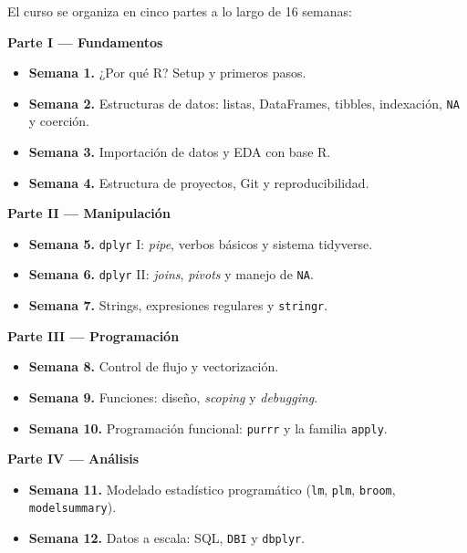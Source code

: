 \documentclass[11pt,letterpaper]{article}
\begin{document}
El curso se organiza en cinco partes a lo largo de 16 semanas:

\smallskip
\noindent\textbf{\textcolor{main}{Parte I --- Fundamentos}}
\begin{itemize}[leftmargin=*, itemsep=1pt]
    \item \textbf{Semana 1.} ¿Por qué R? Setup y primeros pasos.
    \item \textbf{Semana 2.} Estructuras de datos: listas, DataFrames, tibbles, indexación, \texttt{NA} y coerción.
    \item \textbf{Semana 3.} Importación de datos y EDA con base R.
    \item \textbf{Semana 4.} Estructura de proyectos, Git y reproducibilidad.
\end{itemize}

\smallskip
\noindent\textbf{\textcolor{main}{Parte II --- Manipulación}}
\begin{itemize}[leftmargin=*, itemsep=1pt]
    \item \textbf{Semana 5.} \texttt{dplyr} I: \textit{pipe}, verbos básicos y sistema tidyverse.
    \item \textbf{Semana 6.} \texttt{dplyr} II: \textit{joins}, \textit{pivots} y manejo de \texttt{NA}.
    \item \textbf{Semana 7.} Strings, expresiones regulares y \texttt{stringr}.
\end{itemize}

\smallskip
\noindent\textbf{\textcolor{main}{Parte III --- Programación}}
\begin{itemize}[leftmargin=*, itemsep=1pt]
    \item \textbf{Semana 8.} Control de flujo y vectorización.
    \item \textbf{Semana 9.} Funciones: diseño, \textit{scoping} y \textit{debugging}.
    \item \textbf{Semana 10.} Programación funcional: \texttt{purrr} y la familia \texttt{apply}.
\end{itemize}

\smallskip
\noindent\textbf{\textcolor{main}{Parte IV --- Análisis}}
\begin{itemize}[leftmargin=*, itemsep=1pt]
    \item \textbf{Semana 11.} Modelado estadístico programático (\texttt{lm}, \texttt{plm}, \texttt{broom}, \texttt{modelsummary}).
    \item \textbf{Semana 12.} Datos a escala: SQL, \texttt{DBI} y \texttt{dbplyr}.
\end{itemize}
\end{document}
